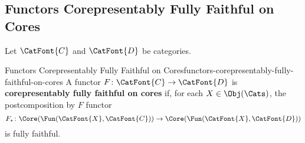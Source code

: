 \subsection{Functors Corepresentably Fully Faithful on Cores}\label{subsection-functors-corepresentably-fully-faithful-on-cores}
Let $\CatFont{C}$ and $\CatFont{D}$ be categories.
\begin{definition}{Functors Corepresentably Fully Faithful on Cores}{functors-corepresentably-fully-faithful-on-cores}%
    A functor $F\colon\CatFont{C}\to\CatFont{D}$ is \textbf{corepresentably fully faithful on cores} if, for each $X\in\Obj(\Cats)$, the postcomposition by $F$ functor
    \[
        F_{*}%
        \colon%
        \Core(\Fun(\CatFont{X},\CatFont{C}))%
        \to
        \Core(\Fun(\CatFont{X},\CatFont{D}))%
    \]%
    is fully faithful.
\end{definition}
